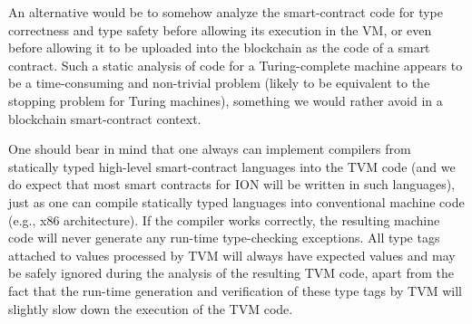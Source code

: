 \documentclass[12pt,oneside]{article}
\begin{document}
An alternative would be to somehow analyze the smart-contract code for type correctness and type safety before allowing its execution in the VM, or even before allowing it to be uploaded into the blockchain as the code of a smart contract. Such a static analysis of code for a Turing-complete machine appears to be a time-consuming and non-trivial problem (likely to be equivalent to the stopping problem for Turing machines), something we would rather avoid in a blockchain smart-contract context.

One should bear in mind that one always can implement compilers from statically typed high-level smart-contract languages into the TVM code (and we do expect that most smart contracts for ION will be written in such languages), just as one can compile statically typed languages into conventional machine code (e.g., x86 architecture). If the compiler works correctly, the resulting machine code will never generate any run-time type-checking exceptions. All type tags attached to values processed by TVM will always have expected values and may be safely ignored during the analysis of the resulting TVM code, apart from the fact that the run-time generation and verification of these type tags by TVM will slightly slow down the execution of the TVM code.
\end{document}
